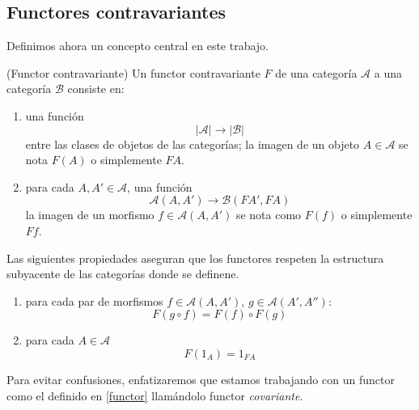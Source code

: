 \subsection{Functores contravariantes}
Definimos ahora un concepto central en este trabajo.

\begin{definicion}
    (Functor contravariante) Un functor contravariante $F$ de una categoría $\mathscr{A}$ a una categoría $\mathscr{B}$ consiste en:

    \begin{enumerate}
        \item una función \begin{equation}|\mathscr{A}| \longrightarrow |\mathscr{B}| \end{equation} entre las clases de objetos de las categorías; la imagen de un objeto $A \in \mathscr{A}$ se nota $F(A)$ o simplemente $FA$.

        \item para cada $A, A' \in \mathscr{A}$, una función \begin{equation}\mathscr{A}(A,A') \longrightarrow \mathscr{B}(FA',FA) \end{equation}
        la imagen de un morfismo $f \in \mathscr{A}(A,A')$ se nota como $F(f)$ o simplemente $Ff$.
    \end{enumerate}
\end{definicion}

\begin{observacion} Las siguientes propiedades aseguran que los functores respeten la estructura subyacente de las categorías donde se definene.
  \begin{enumerate}
        \item para cada par de morfismos $f \in \mathscr{A}(A,A')$, $g \in          \mathscr{A}(A',A''): $ \begin{equation} F(g \circ f) = F(f) \circ F(g)   \end{equation}

        \item para cada $A \in \mathscr{A}$ \begin{equation}
            F(1_{A}) = 1_{FA}
        \end{equation}
    \end{enumerate}  
\end{observacion}

Para evitar confusiones, enfatizaremos que estamos trabajando con un functor como el definido en \ref{functor} llamándolo functor \emph{covariante}.

